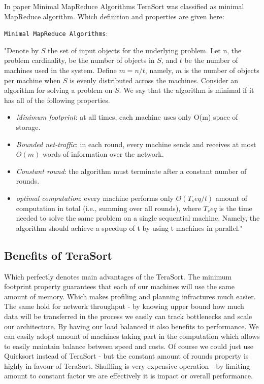 In paper Minimal MapReduce Algorithms TeraSort was classified as
minimal MapReduce algorithm. Which definition and properties are given
here:


\texttt{Minimal MapReduce Algorithms}\citep{minimalmapreduce}:

"Denote by $S$ the set of input objects 
for the underlying problem. Let n, the problem cardinality,
be the number of objects in $S$, and $t$ be the number of machines
used in the system. Define $m = n/t$, namely, $m$ is the number
of objects per machine when $S$ is evenly distributed across the
machines. Consider an algorithm for solving a problem on $S$.
We say that the algorithm is minimal if it has all of the following
properties.

\begin{itemize}
\item \emph{Minimum footprint}: at all times, each machine uses only
O(m) space of storage.
\item \emph{Bounded net-traffic}: in each round, every machine sends
and receives at most $O(m)$ words of information over the
network.
\item  \emph{Constant round}: the algorithm must terminate after a
constant number of rounds.
\item \emph{optimal computation}: every machine performs only
$O(T_seq /t)$ amount of computation in total (i.e., summing
over all rounds), where $T_seq$ is the time needed to solve the
same problem on a single sequential machine. Namely, the
algorithm should achieve a speedup of t by using t machines
in parallel." 
\end{itemize}


\subsection{Benefits of TeraSort}
Which perfectly denotes main advantages of the TeraSort. The minimum footprint property guarantees
that each of our machines will use the same amount of memory. Which makes profiling
and planning infractures much easier. The same hold for network throughput - by knowing
upper bound how much data will be transferred in the process we easily can track bottlenecks
and scale our architecture.
By having our load balanced it also benefits to performance. We can easily adopt amount of machines
taking part in the computation which allows to easily maintain balance between speed and costs.
Of course we could just use Quicksort instead of TeraSort - but the constant amount of rounds property
is highly in favour of TeraSort. Shuffling is very expensive operation - by limiting amount to constant
factor we are effectively it is impact or overall performance.
